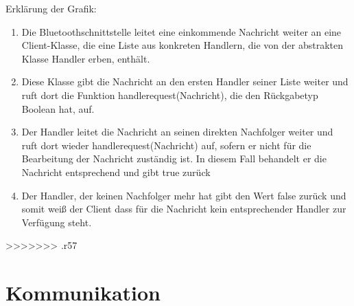 \documentclass[10pt,a4paper]{article}
\let\oldsection\section
\renewcommand{\section}{\newpage \oldsection}
\begin{document}
  			
  			Erklärung der Grafik:
   			\begin{enumerate}
  				\item Die Bluetoothschnittstelle leitet eine einkommende Nachricht weiter an eine Client-Klasse, die eine Liste aus konkreten Handlern,
  					die von der abstrakten Klasse Handler erben, enthält.
  				\item Diese Klasse gibt die Nachricht an den ersten Handler seiner Liste weiter und ruft dort die Funktion handlerequest(Nachricht),
  					die den Rückgabetyp Boolean hat, auf.
  				\item Der Handler leitet die Nachricht an seinen direkten Nachfolger weiter und ruft dort wieder handlerequest(Nachricht) auf, sofern
  					er nicht für die Bearbeitung der Nachricht zuständig ist. In diesem Fall behandelt er die Nachricht entsprechend und gibt true zurück
  				\item Der Handler, der keinen Nachfolger mehr hat gibt den Wert false zurück und somit weiß der Client dass für die Nachricht kein
  					entsprechender Handler zur Verfügung steht.  					
  			\end{enumerate}   	  								
>>>>>>> .r57
	\section{Kommunikation}
				
	\newpage	
	\printglossary[style=altlist,title=Glossar]
						
\end{document}
